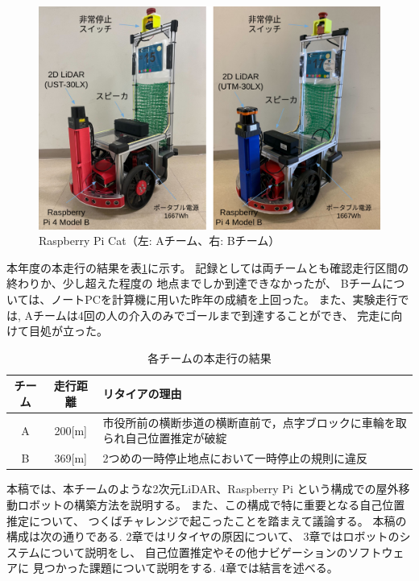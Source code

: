 \documentclass[twocolumn,9pt]{jsproceedings}
\begin{document}
\begin{figure}[h]
 	\begin{center}
 		\includegraphics[width=1.0\linewidth]{figs/raspicat.pdf}
 		\caption{Raspberry Pi Cat（左: Aチーム、右: Bチーム）}
 		\label{fig:raspicat}
 	\end{center}
\end{figure}

本年度の本走行の結果を表\ref{MainRun}に示す。
記録としては両チームとも確認走行区間の終わりか、少し超えた程度の
地点までしか到達できなかったが、
Bチームについては、ノートPCを計算機に用いた昨年の成績を上回った。
また、実験走行では, Aチームは4回の人の介入のみでゴールまで到達することができ、
完走に向けて目処が立った。

\begin{table}[h]
  \caption{各チームの本走行の結果}
  \label{MainRun}
	\begin{tabular}{|c|c|p{5.4cm}|}
    \hline
	チーム & 走行距離 & リタイアの理由 \\
    \hline
	A & 200[m] & 市役所前の横断歩道の横断直前で，点字ブロックに車輪を取られ自己位置推定が破綻\\
    \hline
	B & 369[m] & 2つめの一時停止地点において一時停止の規則に違反 \\ 
    \hline
  \end{tabular}
\end{table}


本稿では、本チームのような2次元LiDAR、Raspberry Pi
という構成での屋外移動ロボットの構築方法を説明する。
また、この構成で特に重要となる自己位置推定について、
つくばチャレンジで起こったことを踏まえて議論する。
本稿の構成は次の通りである. 
2章ではリタイヤの原因について、
3章ではロボットのシステムについて説明をし、
自己位置推定やその他ナビゲーションのソフトウェアに
見つかった課題について説明をする. 
4章では結言を述べる。
\end{document}
